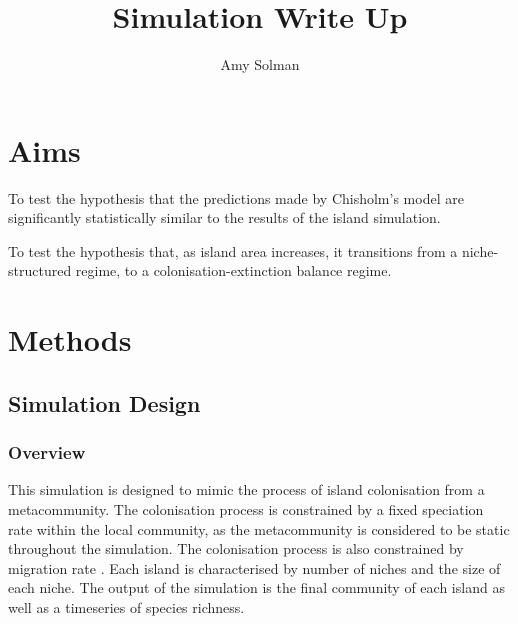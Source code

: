 \documentclass{article}
\begin{document}
\title{Simulation Write Up{}}
\author{Amy Solman}

\maketitle

\section{Aims}
To test the hypothesis that the predictions made by Chisholm’s model are significantly statistically similar to the results of the island simulation. \bigskip

\noindent To test the hypothesis that, as island area increases, it transitions from a niche-structured regime, to a colonisation-extinction balance regime. 

\section{Methods}

\subsection{Simulation Design}

\subsubsection{Overview}
This simulation is designed to mimic the process of island colonisation from a metacommunity. The colonisation process is constrained by a fixed speciation rate within the local community, as the metacommunity is considered to be static throughout the simulation. The colonisation process is also constrained by migration rate . Each island is characterised by number of niches and the size of each niche. The output of the simulation is the final community of each island as well as a timeseries of species richness. 
\end{document}
